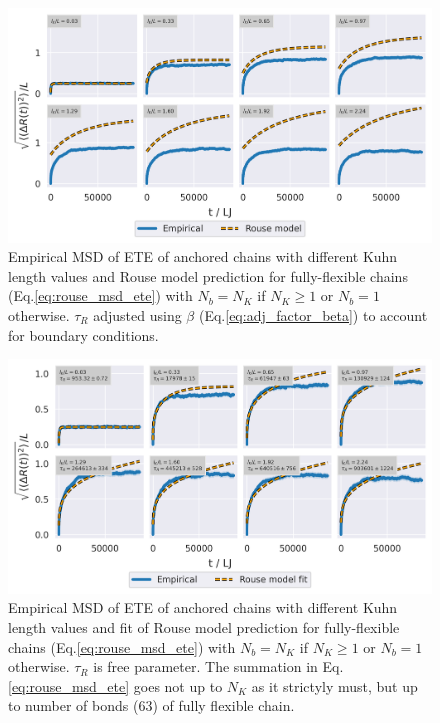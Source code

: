 \documentclass[
    paper=A4,pagesize=automedia,fontsize=12pt,
    BCOR=15mm,DIV=22,
    twoside,headinclude,footinclude=false,
    fleqn,             %
    bibliography=totocnumbered,          %
    listof=totoc,                %
    listof=flat,                 %
    cleardoublepage=empty      %
    numbers=endperiod
]{scrartcl}
\begin{document}
\begin{figure}
    \begin{center}
      \includegraphics[width=\columnwidth,trim={0cm 0cm 0cm 0.0cm},clip]{4-exp-delta_R-rouse_anal.png}
      \caption{\label{fig:msd_anchored_l_K_rouse_fit_anal}
      Empirical MSD of ETE of anchored chains with different Kuhn length values
      and Rouse model prediction for fully-flexible chains (Eq.\ref{eq:rouse_msd_ete})
      with $N_b = N_K$ if $N_K \ge 1$ or $N_b=1$ otherwise. $\tau_R$ adjusted
      using $\beta$ (Eq.\ref{eq:adj_factor_beta}) to account for boundary conditions.
      }
    \end{center}
\end{figure}
\begin{figure}
    \begin{center}
      \includegraphics[width=\columnwidth,trim={0cm 0cm 0cm 0.0cm},clip]{4-exp-delta_R-rouse_fit-tau.png}
      \caption{\label{fig:msd_anchored_l_K_rouse_fit-tau}
      Empirical MSD of ETE of anchored chains with different Kuhn length values
      and fit of Rouse model prediction for fully-flexible chains 
      (Eq.\ref{eq:rouse_msd_ete}) with $N_b = N_K$ if $N_K \ge 1$ or $N_b=1$ otherwise.
      $\tau_R$ is free parameter. The summation in Eq.\ref{eq:rouse_msd_ete}
      goes not up to $N_K$ as it strictyly must, but up to number of bonds (63)
      of fully flexible chain.
      }
    \end{center}
\end{figure}
\end{document}
